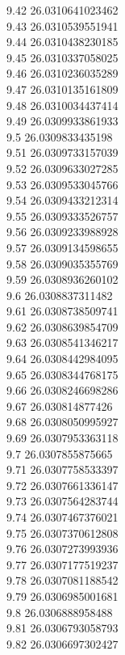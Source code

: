 {9.42	26.0310641023462\\
9.43	26.0310539551941\\
9.44	26.0310438230185\\
9.45	26.0310337058025\\
9.46	26.0310236035289\\
9.47	26.0310135161809\\
9.48	26.0310034437414\\
9.49	26.0309933861933\\
9.5	26.0309833435198\\
9.51	26.0309733157039\\
9.52	26.0309633027285\\
9.53	26.0309533045766\\
9.54	26.0309433212314\\
9.55	26.0309333526757\\
9.56	26.0309233988928\\
9.57	26.0309134598655\\
9.58	26.0309035355769\\
9.59	26.0308936260102\\
9.6	26.0308837311482\\
9.61	26.0308738509741\\
9.62	26.0308639854709\\
9.63	26.0308541346217\\
9.64	26.0308442984095\\
9.65	26.0308344768175\\
9.66	26.0308246698286\\
9.67	26.030814877426\\
9.68	26.0308050995927\\
9.69	26.0307953363118\\
9.7	26.0307855875665\\
9.71	26.0307758533397\\
9.72	26.0307661336147\\
9.73	26.0307564283744\\
9.74	26.0307467376021\\
9.75	26.0307370612808\\
9.76	26.0307273993936\\
9.77	26.0307177519237\\
9.78	26.0307081188542\\
9.79	26.0306985001681\\
9.8	26.0306888958488\\
9.81	26.0306793058793\\
9.82	26.0306697302427\\
}
